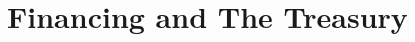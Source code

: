 %
%
\let\textcircled=\pgftextcircled
\chapter{Financing and The Treasury}
\label{chap:finance}

\initial{}



